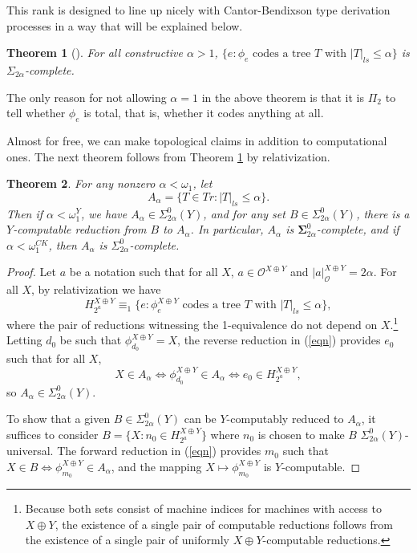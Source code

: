 \documentclass[12pt]{amsart}
\newtheorem{theorem}{Theorem}
\newcommand{\kO}{\mathcal{O}}
\begin{document}
This rank is designed to line up nicely with Cantor-Bendixson type 
derivation processes in a way that will be explained below.

\begin{theorem}[\cite{Westrick2014}]\label{ladrthm}
For all constructive $\alpha > 1$,
$\{e : \phi_e \text{ codes a tree $T$ with } |T|_{ls} \leq \alpha\}$ is 
$\Sigma_{2\alpha}$-complete.
\end{theorem}

The only reason for not allowing $\alpha = 1$ in the above theorem 
is that it is $\Pi_2$ to tell whether $\phi_e$ is total, that is, 
whether it codes anything at all.  

Almost for free, we can make topological claims in addition to 
computational ones.  The next theorem follows from Theorem 
\ref{ladrthm} by relativization.

\begin{theorem}\label{ladredst}
For any nonzero $\alpha < \omega_1$, let  
$$A_\alpha = \{T \in Tr : |T|_{ls} \leq \alpha\}.$$  Then
if $\alpha < \omega_1^Y$, we have $A_\alpha \in \Sigma^0_{2\alpha}(Y)$, 
and for any set $B \in \Sigma^0_{2\alpha}(Y)$, there is a $Y$-computable 
reduction from $B$ to $A_\alpha$.  In particular, $A_\alpha$ is 
$\mathbf \Sigma^0_{2\alpha}$-complete, and if $\alpha < \omega_1^{CK}$, 
then $A_\alpha$ is $\Sigma^0_{2\alpha}$-complete.
\end{theorem}
\begin{proof} Let $a$ be a notation such that for all $X$, 
$a \in \kO^{X\oplus Y}$ and $|a|_{\kO}^{X\oplus Y} = 2\alpha$.
For all $X$, by relativization we have
\begin{equation}\label{eqn}
H_{2^a}^{X\oplus Y} \equiv_1 \{e : \phi_e^{X\oplus Y} 
\text{ codes a tree $T$ with } |T|_{ls} \leq \alpha\},
\end{equation}
where the pair of reductions witnessing the 1-equivalence 
do not depend on $X$.\footnote{Because both sets consist of machine 
indices for machines with access to $X\oplus Y$, the existence 
of a single pair of computable reductions follows 
from the existence of a single pair of uniformly $X\oplus Y$-computable 
reductions.}  Letting $d_0$ be such that $\phi_{d_0}^{X\oplus Y} = X$,
the reverse reduction in (\ref{eqn}) provides $e_0$ such that for 
all $X$,
$$X \in A_\alpha \iff \phi_{d_0}^{X\oplus Y} \in A_\alpha 
\iff e_0 \in H_{2^a}^{X\oplus Y},$$
so $A_\alpha \in \Sigma^0_{2\alpha}(Y)$.

To show that a given $B \in \Sigma^0_{2\alpha}(Y)$ can be 
$Y$-computably reduced to $A_\alpha$, it suffices to consider
$B = \{X : n_0 \in H_{2^a}^{X\oplus Y}\}$ where $n_0$ is chosen 
to make $B$ $\Sigma^0_{2\alpha}(Y)$-universal.  The forward 
reduction in (\ref{eqn}) provides $m_0$ such that 
$X \in B \iff \phi_{m_0}^{X\oplus Y} \in A_\alpha$, and the mapping 
$X\mapsto \phi_{m_0}^{X\oplus Y}$ is $Y$-computable.
\end{proof}
\end{document}
